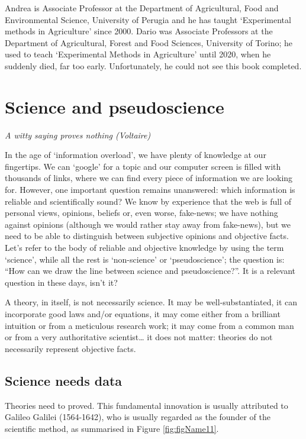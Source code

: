 \documentclass[a4paper,12pt,oneside]{book}
\begin{document}
Andrea is Associate Professor at the Department of Agricultural, Food and Environmental Science, University of Perugia and he has taught `Experimental methods in Agriculture' since 2000. Dario was Associate Professors at the Department of Agricultural, Forest and Food Sciences, University of Torino; he used to teach `Experimental Methods in Agriculture' until 2020, when he suddenly died, far too early. Unfortunately, he could not see this book completed.

\hypertarget{science-and-pseudoscience}{%
\chapter{Science and pseudoscience}\label{science-and-pseudoscience}}

\emph{A witty saying proves nothing (Voltaire)}

In the age of `information overload', we have plenty of knowledge at our fingertips. We can `google' for a topic and our computer screen is filled with thousands of links, where we can find every piece of information we are looking for. However, one important question remains unanswered: which information is reliable and scientifically sound? We know by experience that the web is full of personal views, opinions, beliefs or, even worse, fake-news; we have nothing against opinions (although we would rather stay away from fake-news), but we need to be able to distinguish between subjective opinions and objective facts. Let's refer to the body of reliable and objective knowledge by using the term `science', while all the rest is `non-science' or `pseudoscience'; the question is: ``How can we draw the line between science and pseudoscience?''. It is a relevant question in these days, isn't it?

A theory, in itself, is not necessarily science. It may be well-substantiated, it can incorporate good laws and/or equations, it may come either from a brilliant intuition or from a meticulous research work; it may come from a common man or from a very authoritative scientist\ldots{} it does not matter: theories do not necessarily represent objective facts.

\hypertarget{science-needs-data}{%
\section{Science needs data}\label{science-needs-data}}

Theories need to proved. This fundamental innovation is usually attributed to Galileo Galilei (1564-1642), who is usually regarded as the founder of the scientific method, as summarised in Figure \ref{fig:figName11}.
\end{document}
